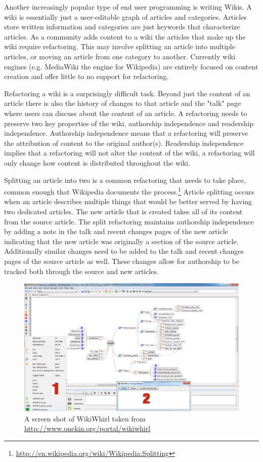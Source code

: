 Another increasingly popular type of end user programming is writing Wikis. A wiki is essentially just a user-editable graph of articles and categories. Articles store written information and categories are just keywords that characterize articles. As a community adds content to a wiki the articles that make up the wiki require refactoring. This may involve splitting an article into multiple articles, or moving an article from one category to another. Currently wiki engines (e.g. MediaWiki the engine for Wikipedia) are entirely focused on content creation and offer little to no support for refactoring.

Refactoring a wiki is a surprisingly difficult task. Beyond just the content of an article there is also the history of changes to that article and the "talk" page where users can discuss about the content of an article. A refactoring needs to preserve two key properties of the wiki, authorship independence and readership independence. Authorship independence means that a refactoring will preserve the attribution of content to the original author(s). Readership independence implies that a refactoring will not alter the content of the wiki, a refactoring will only change how content is distributed throughout the wiki.

Splitting an article into two is a common refactoring that needs to take place, common enough that Wikipedia documents the process.\footnote{\url{http://en.wikipedia.org/wiki/Wikipedia:Splitting}} Article splitting occurs when an article describes multiple things that would be better served by having two dedicated articles. The new article that is created takes all of its content from the source article. The split refactoring maintains authorship independence by adding a note in the talk and recent changes pages of the new article indicating that the new article was originally a section of the source article. Additionally similar changes need to be added to the talk and recent changes pages of the source article as well. These changes allow for authorship to be tracked both through the source and new articles.


\begin{figure}[t]\label{wikiwhirl}
	\begin{center}
		\includegraphics[scale=.4]{images/wikiwhirl_mindmap.png}
	\end{center}
	\caption{A screen shot of WikiWhirl taken from \url{http://www.onekin.org/portal/wikiwhirl}}
\end{figure}

